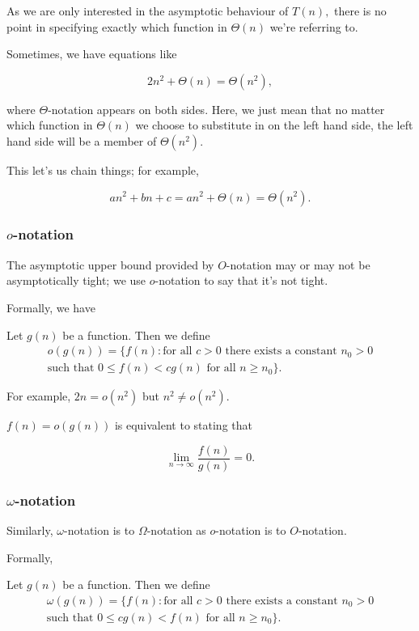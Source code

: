 \documentclass{article}
\newcommand{\qlim}[2]{\lim_{#1 \rightarrow #2}}
\begin{document}
As we are only interested in the asymptotic behaviour of $T(n),$ there is no point in specifying exactly which function in $\Theta(n)$ we're referring to.

Sometimes, we have equations like

$$2n^2 + \Theta(n) = \Theta(n^2),$$

where $\Theta$-notation appears on both sides. Here, we just mean that no matter which function in $\Theta(n)$ we choose to substitute in on the left hand side, the left hand side will be a member of $\Theta(n^2).$

This let's us chain things; for example,

$$an^2 + bn + c = an^2 + \Theta(n) = \Theta(n^2).$$

\subsubsection{$o$-notation}

The asymptotic upper bound provided by $O$-notation may or may not be asymptotically tight; we use $o$-notation to say that it's not tight.

Formally, we have

\begin{tcolorbox}[title=$o$-notation]
	Let $g(n)$ be a function. Then we define
	\begin{multline*}
		o(g(n)) = \{ f(n) : \text{for all } c > 0 \text{ there exists a constant } n_0 > 0 \\ \text{such that } 0 \leq f(n) < cg(n) \text{ for all } n \geq n_0 \}.
	\end{multline*}
\end{tcolorbox}

\vspace{5mm}

For example, $2n = o(n^2)$ but $n^2 \neq o(n^2).$

$f(n) = o(g(n))$ is equivalent to stating that

$$\qlim{n}{\infty} \frac{f(n)}{g(n)} = 0.$$

\subsubsection{$\omega$-notation}

Similarly, $\omega$-notation is to $\Omega$-notation as $o$-notation is to $O$-notation. 

Formally,

\begin{tcolorbox}[title=$o$-notation]
	Let $g(n)$ be a function. Then we define
	\begin{multline*}
		\omega(g(n)) = \{ f(n) : \text{for all } c > 0 \text{ there exists a constant } n_0 > 0 \\ \text{such that } 0 \leq cg(n) < f(n) \text{ for all } n \geq n_0 \}.
	\end{multline*}
\end{tcolorbox}
\end{document}
